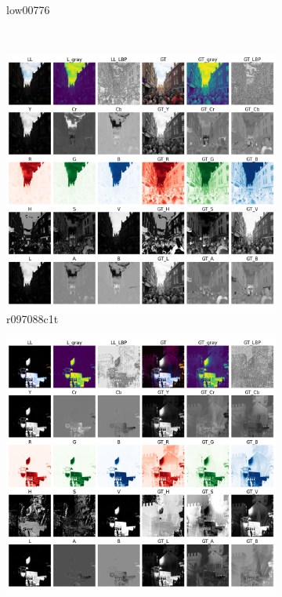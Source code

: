 \documentclass[a4paper]{ctexart}
\begin{document}
\begin{figure}[htbp]
\begin{subfigure}{0.3\textwidth}
			\captionsetup{font=scriptsize}
			\caption{low00776}
			\label{fig: myplot_different_color_channels_low00776}	
		\end{subfigure}\\
		\begin{subfigure}{0.3\textwidth}
			\includegraphics[width=\linewidth]{picture/LLIE/Experiment/myplot_different_color_channels_r097088c1t}
			\captionsetup{font=scriptsize}
			\caption{r097088c1t}
			\label{fig: myplot_different_color_channels_r097088c1t}	
		\end{subfigure}
		\begin{subfigure}{0.3\textwidth}
			\includegraphics[width=\linewidth]{picture/LLIE/Experiment/myplot_different_color_channels_r141669e5t}

\end{subfigure}
\end{figure}
\end{document}
